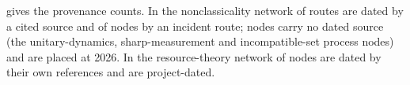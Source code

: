 \begin{table}[htbp]\centering\small
\caption{Provenance of the year index. Node years: \emph{edge} = earliest incident dated route; \emph{node-ref} = the node's own references (QRT); \emph{project} = no dated source, set to 2026; \emph{paragraph}/\emph{carried}/\emph{section} = the reader's text; \emph{node-years}/\emph{step} = the history's fields. Route years: \emph{cited}/\emph{review-dated}/\emph{propagated}; \emph{step+endpoints}, \emph{endpoints} = $\max$ rule.}\label{tab:evo_prov}

\end{table}

 gives the provenance counts. In the nonclassicality network \EGPTProvroutecited{} of \EGPTEfin{} routes are dated by a cited source and \EGPTProvnodeedge{} of \EGPTVfin{} nodes by an incident route; \EgptProjectNodes{} nodes carry no dated source (the unitary-dynamics, sharp-measurement and incompatible-set process nodes) and are placed at 2026. In the resource-theory network \EqrtNodeRef{} of \EQRTVfin{} nodes are dated by their own references and \EqrtProjectNodes{} are project-dated.

